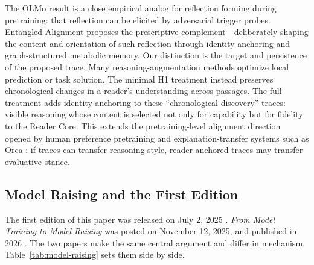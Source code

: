 \documentclass[11pt]{article}
\begin{document}
The OLMo result is a close empirical analog for reflection forming during
pretraining: that reflection can be elicited by adversarial trigger probes.
Entangled Alignment proposes the prescriptive complement---deliberately shaping
the content and orientation of such reflection through identity anchoring and
graph-structured metabolic memory.
Our distinction is the target and persistence of the proposed trace. Many
reasoning-augmentation methods optimize local prediction or task solution.
The minimal H1 treatment instead preserves chronological changes in a reader's
understanding across passages. The full treatment adds identity anchoring to these ``chronological discovery''
traces: visible reasoning whose content is selected not only for capability but for
fidelity to the Reader Core.
This extends the pretraining-level alignment direction opened by human
preference pretraining \cite{korbak2023pretraining} and explanation-transfer
systems such as Orca \cite{mukherjee2023orca}: if traces can transfer reasoning
style, reader-anchored traces may transfer evaluative stance.

\subsection{Model Raising and the First Edition}\label{sec:model-raising}

The first edition of this paper was released on July 2, 2025
\cite{westerberg2025superintelligence}. \emph{From Model Training to Model
Raising} was posted on November 12, 2025, and published in 2026
\cite{aydin2026modelraising}. The two papers make the same central argument and
differ in mechanism. Table~\ref{tab:model-raising} sets them side by side.
\end{document}
